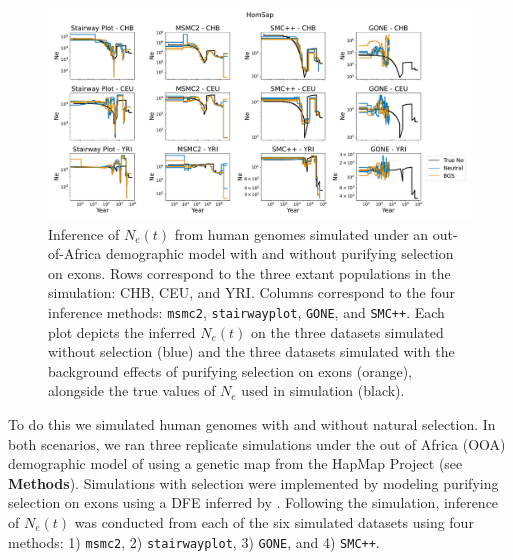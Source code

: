 \documentclass[hidelinks]{article}
\newcommand{\msmc}{\texttt{msmc2}\xspace}
\newcommand{\stairway}{\texttt{stairwayplot}\xspace}
\newcommand{\gone}{\texttt{GONE}\xspace}
\newcommand{\smcpp}{\texttt{SMC++}\xspace}
\begin{document}
    
    \begin{figure}[b!]
        \centering
        \includegraphics[width=\textwidth]{figures/HomSap/OOA/estimated_Ne_t_final}
        \caption{
        \label{fig:human-demography}
        Inference of $N_e(t)$ from human genomes simulated under an out-of-Africa demographic model \citep{ragsdale2019models}
        with and without purifying selection on exons. 
        Rows correspond to the three extant populations in the simulation: CHB, CEU, and YRI.
        Columns correspond to the four inference methods:    
        \msmc \citep{Schiffels2020}, \stairway \citep{liu2020stairway}, \gone \citep{santiago2020recent}, and \smcpp \citep{terhorst2017robust}.
        Each plot depicts the inferred $N_e(t)$ on the three datasets simulated without selection (blue)
        and the three datasets simulated with the background effects of purifying selection on exons (orange),
        alongside the true values of $N_e$ used in simulation (black).
        }
    \end{figure}

    To do this we simulated human genomes with and without natural selection.
    In both scenarios, we ran three replicate simulations
    under the out of Africa (OOA) demographic model of
    \citep{ragsdale2019models} using a genetic map from the HapMap Project \citep{international2007second} (see \textbf{Methods}).
    Simulations with selection were implemented by modeling purifying selection on exons
    using a DFE inferred by \cite{kim2017inference}.
    Following the simulation, inference of $N_e(t)$ was conducted from each of the six simulated datasets using four methods: 1) \msmc \citep{Schiffels2020}, 
    2) \stairway \citep{liu2020stairway}, 3) \gone \citep{santiago2020recent}, and 4) \smcpp \citep{terhorst2017robust}.
\end{document}
